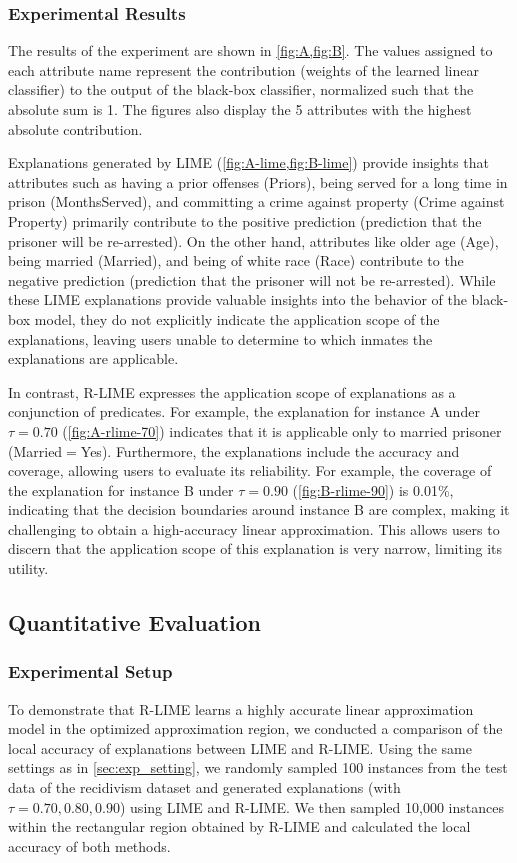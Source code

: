 \documentclass[11pt]{article}
\begin{document}
\subsubsection{Experimental Results}
The results of the experiment are shown in \cref{fig:A,fig:B}.
The values assigned to each attribute name represent the contribution
(weights of the learned linear classifier)
to the output of the black-box classifier,
normalized such that the absolute sum is 1.
The figures also display the 5 attributes with the highest absolute contribution.

Explanations generated by LIME (\cref{fig:A-lime,fig:B-lime}) provide insights
that attributes such as having a prior offenses (Priors),
being served for a long time in prison (MonthsServed),
and committing a crime against property (Crime against Property)
primarily contribute to the positive prediction
(prediction that the prisoner will be re-arrested).
On the other hand,
attributes like older age (Age), being married (Married),
and being of white race (Race) contribute to the negative prediction
(prediction that the prisoner will not be re-arrested).
While these LIME explanations provide valuable insights into the behavior of
the black-box model,
they do not explicitly indicate the application scope of the explanations,
leaving users unable to determine to which inmates the explanations are applicable.

In contrast, R-LIME expresses the application scope of explanations
as a conjunction of predicates.
For example, the explanation for instance A
under $\tau=0.70$ (\cref{fig:A-rlime-70}) indicates that it is applicable
only to married prisoner (Married$=$Yes).
Furthermore, the explanations include the accuracy and coverage,
allowing users to evaluate its reliability.
For example, the coverage of the explanation for instance B under $\tau=0.90$
(\cref{fig:B-rlime-90}) is 0.01\%,
indicating that the decision boundaries around instance B are complex,
making it challenging to obtain a high-accuracy linear approximation.
This allows users to discern that the application scope of this explanation is
very narrow, limiting its utility.

\subsection{Quantitative Evaluation}\label{sec:exp2}
\subsubsection{Experimental Setup}
To demonstrate that R-LIME learns a highly accurate linear approximation model
in the optimized approximation region,
we conducted a comparison of the local accuracy of explanations
between LIME and R-LIME\@.
Using the same settings as in \cref{sec:exp_setting},
we randomly sampled 100 instances from the test data of the recidivism dataset
and generated explanations (with $\tau=0.70,0.80,0.90$) using LIME and R-LIME\@.
We then sampled 10,000 instances within the rectangular region
obtained by R-LIME and calculated the local accuracy of both methods.
\end{document}
